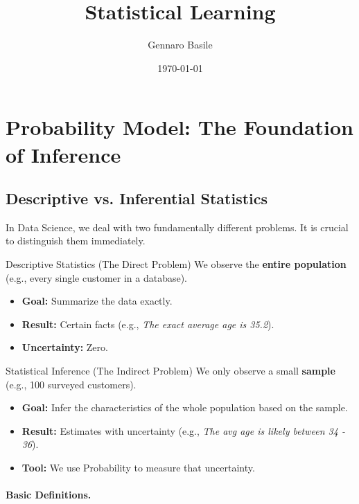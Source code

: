 \documentclass[11pt]{article}
\title{\Huge Statistical Learning}
\author{\Large Gennaro Basile}
\date{\today}
\theoremstyle{smallexample}
\begin{document}
\maketitle
{}
\captionsetup[figure]{labelfont=bf}

\pagebreak

\tableofcontents
\pagebreak


\section{Probability Model: The Foundation of Inference}

\subsection{Descriptive vs. Inferential Statistics}

In Data Science, we deal with two fundamentally different problems. It is crucial to distinguish them immediately.

\begin{defbox}{Descriptive Statistics (The Direct Problem)}
We observe the \textbf{entire population} (e.g., every single customer in a database).
\begin{itemize}
    \item \textbf{Goal:} Summarize the data exactly.
    \item \textbf{Result:} Certain facts (e.g., \textit{The exact average age is 35.2}).
    \item \textbf{Uncertainty:} Zero.
\end{itemize}
\end{defbox}

\begin{defbox}{Statistical Inference (The Indirect Problem)}
We only observe a small \textbf{sample} (e.g., 100 surveyed customers).
\begin{itemize}
    \item \textbf{Goal:} Infer the characteristics of the whole population based on the sample.
    \item \textbf{Result:} Estimates with uncertainty (e.g., \textit{The avg age is likely between 34 - 36}).
    \item \textbf{Tool:} We use Probability to measure that uncertainty.
\end{itemize}
\end{defbox}

\paragraph{Basic Definitions. }
\end{document}
